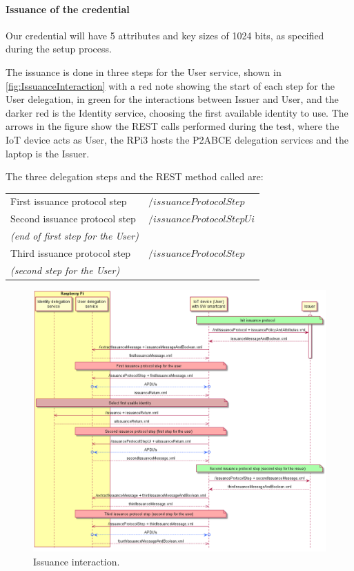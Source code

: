 \documentclass[journal]{IEEEtran}
\begin{document}
\paragraph{Issuance of the credential}\hfil

Our credential will have 5 attributes and key sizes of 1024 bits, as specified during the setup process.

The issuance is done in three steps for the User service, shown in \autoref{fig:IssuanceInteraction} with a red note showing the start of each step for the User delegation, in green for the interactions between Issuer and User, and the darker red is the Identity service, choosing the first available identity to use. The arrows in the figure show the REST calls performed during the test, where the IoT device acts as User, the RPi3 hosts the P2ABCE delegation services and the laptop is the Issuer.

The three delegation steps and the REST method called are:

\begin{center}
	\begin{tabular}{l|l}
		First issuance protocol step & $/issuanceProtocolStep$ \\
		Second issuance protocol step  & $/issuanceProtocolStepUi$ \\
		\textit{(end of first step for the User)} & \\
		Third issuance protocol step & $/issuanceProtocolStep$ \\
		\textit{(second step for the User)}  & \\
	\end{tabular}
\end{center}


\begin{figure}[bth]
	\begin{center}
		\includegraphics[width=\linewidth]{gfx/UML/IssuanceInteraction}
	\end{center}
	\caption{Issuance interaction.}
	\label{fig:IssuanceInteraction}
\end{figure}
\end{document}
